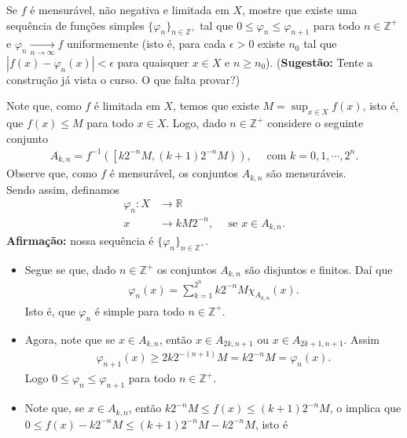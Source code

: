 \begin{homeworkProblem}[2]
  Se $f$ é mensurável, não negativa e limitada em $X$, mostre que existe uma sequência de funções simples $\{\varphi_n\}_{n\in\mathbb{Z}^{+}}$ tal que $0\leq\varphi_{n}\leq\varphi_{n+1}$ para todo $n\in\mathbb{Z}^{+}$ e $\varphi_{n}\xrightarrow[n\to\infty]{}f$ uniformemente (isto é, para cada $\epsilon>0$ existe $n_0$ tal que $|f(x)-\varphi_{n}(x)|<\epsilon$ para quaisquer $x\in X$ e $n\geq n_0$). (\textbf{Sugestão:} Tente a construção já vista o curso. O que falta provar?)
  \begin{solution}
    Note que, como $f$ é limitada em $X$, temos que existe $M=\sup_{x\in X}f(x)$, isto é, que $f(x)\leq M$ para todo $x\in X$. Logo, dado $n\in\mathbb{Z}^{+}$ considere o seguinte conjunto
    \begin{align*}
      A_{k,n}=f^{-1}\left( \left[k2^{-n}M,(k+1)2^{-n}M\right) \right),\quad\text{ com }k=0,1,\cdots,2^{n}.
    \end{align*}
    Observe que, como $f$ é mensurável, os conjuntos $A_{k,n}$ são mensuráveis.\\
    Sendo assim, definamos 
    \begin{align*}
      \varphi_n:X&\to\mathbb{R}\\
                x&\to kM2^{-n},\quad \text{ se } \displaystyle x\in A_{k,n} \text{.}
    \end{align*}
    \textbf{Afirmação:} nossa sequência é $\{\varphi_n\}_{n\in\mathbb{Z}^{+}}$.
    \begin{itemize}
      \item Segue se que, dado $n\in\mathbb{Z}^{+}$ os conjuntos $A_{k,n}$ são disjuntos e finitos. Daí que
        \begin{align*}
          \varphi_{n}(x)=\sum_{k=1}^{2^{n}}k2^{-n}M\chi_{A_{k,n}}(x).
        \end{align*}
        Isto é, que $\varphi_n$ é simple para todo $n\in\mathbb{Z}^{+}$.
      \item Agora, note que se $x\in A_{k,n}$, então $x\in A_{2k,n+1}$ ou $x\in A_{2k+1,n+1}$. Assim
        \begin{align*}
          \varphi_{n+1}(x)\geq 2k2^{-(n+1)}M=k2^{-n}M=\varphi_{n}(x).
        \end{align*}
        Logo $0\leq \varphi_{n}\leq\varphi_{n+1}$ para todo $n\in\mathbb{Z}^{+}$.
      \item Note que, se $x\in A_{k,n}$, então $k2^{-n}M\leq f(x)\leq (k+1)2^{-n}M$, o implica que $0\leq f(x)-k2^{-n}M\leq (k+1)2^{-n}M-k2^{-n}M$, isto é

\end{itemize}
\end{solution}
\end{homeworkProblem}
